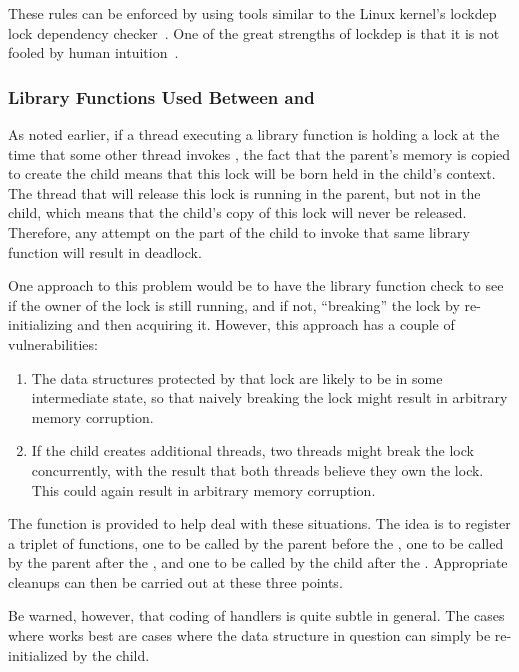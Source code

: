 These rules can be enforced by using tools similar to
the Linux kernel's lockdep lock dependency
checker~\cite{JonathanCorbet2006lockdep}.
One of the great strengths of lockdep is that it is not fooled by
human intuition~\cite{StevenRostedt2011locdepCryptic}.

\subsubsection{Library Functions Used Between  and }
\label{sec:locking:Library Functions Used Between fork() and exec()}

As noted earlier, if a thread executing a library function is holding
a lock at the time that some other thread invokes , the
fact that the parent's memory is copied to create the child means that
this lock will be born held in the child's context.
The thread that will release this lock is running in the parent, but not
in the child, which means that the child's copy of this lock will never
be released.
Therefore, any attempt on the part of the child to invoke that same
library function will result in deadlock.

One approach to this problem would be to have the library function
check to see if the owner of the lock is still running, and if not,
``breaking'' the lock by re-initializing and then acquiring it.
However, this approach has a couple of vulnerabilities:

\begin{enumerate}
\item	The data structures protected by that lock are likely to
	be in some intermediate state, so that naively breaking the lock
	might result in arbitrary memory corruption.
\item	If the child creates additional threads, two threads might
	break the lock concurrently, with the result that both
	threads believe they own the lock.
	This could again result in arbitrary memory corruption.
\end{enumerate}

The  function is provided to help deal with these situations.
The idea is to register a triplet of functions, one to be called by the
parent before the , one to be called by the parent after the
, and one to be called by the child after the .
Appropriate cleanups can then be carried out at these three points.

Be warned, however, that coding of  handlers is quite subtle
in general.
The cases where  works best are cases where the data structure
in question can simply be re-initialized by the child.

